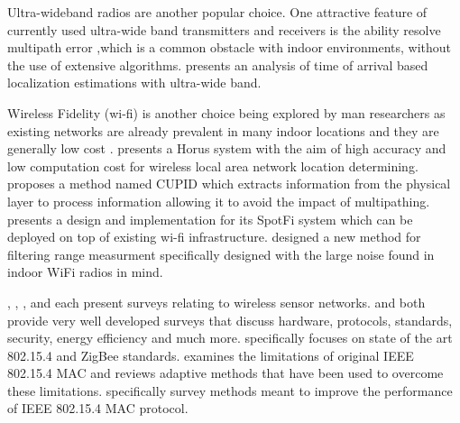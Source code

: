 \documentclass[conference]{IEEEtran}
\begin{document}
			Ultra-wideband radios are another popular choice. One attractive feature of currently used ultra-wide band transmitters and receivers is the ability resolve multipath error ,which is a common obstacle with indoor environments, without the use of extensive algorithms. \cite{Gezici2005} presents an analysis of time of arrival based localization estimations with ultra-wide band. 
			
			Wireless Fidelity (wi-fi)  is another choice being explored by man researchers as existing networks are already prevalent in many indoor locations and they are generally low cost \cite{Youssef2005} \cite{Sen2013} \cite{Kotaru2015} \cite{Rea2017}. \cite{Youssef2005} presents a Horus system with the aim of high accuracy and low computation cost for wireless local area network location determining. \cite{Sen2013} proposes a method named CUPID which extracts information from the physical layer to process information allowing it to avoid the impact of multipathing. \cite{Kotaru2015} presents a design and implementation for its SpotFi system which can be deployed on top of existing wi-fi infrastructure. \cite{Rea2017} designed a new method for filtering range measurment specifically designed with the large noise found in indoor WiFi radios in mind. 
			
			
			 \cite{Baronti2007}, \cite{Khanafer2014}, \cite{Akyildiz2002}, and \cite{Xia2011} each present surveys relating to wireless sensor networks.  \cite{Baronti2007} and \cite{Akyildiz2002} both provide very well developed surveys that discuss hardware, protocols, standards, security, energy efficiency and much more. \cite{Baronti2007} specifically focuses on state of the art 802.15.4 and ZigBee standards. \cite{Xia2011} examines the limitations of original IEEE 802.15.4 MAC and reviews adaptive methods that have been used to overcome these limitations. \cite{Khanafer2014} specifically survey methods meant to improve the performance of IEEE 802.15.4 MAC protocol.

			
			
			
			
			
\end{document}
